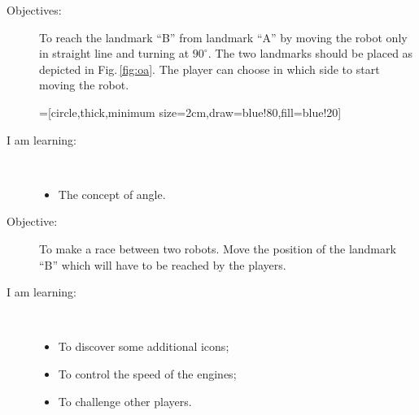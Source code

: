 \begin{flushleft}
\begin{description}
\item[Objectives:] To reach the landmark ``B'' from landmark ``A'' by moving the robot only in straight line and turning at $90^{\circ}$. The two landmarks should be placed as depicted in Fig.\,\ref{fig:oa}. The player can choose in which side to start moving the robot. 
\begin{minipage}[c]{\textwidth}
\centering
{}=[circle,thick,minimum size=2cm,draw=blue!80,fill=blue!20]
\vspace{1ex}
\label{fig:oa}
\end{minipage}
\item[I am learning:] \hfill \\ \vspace{-1ex}
  \begin{itemize}
  \item The concept of angle.
  \end{itemize}
\end{description}
\end{flushleft}
\frameboxend

\begin{flushleft}
\begin{description}
\item[Objective:] To make a race between two robots. Move the position of the landmark ``B'' which will have to be reached by the players.
\item[I am learning:] \hfill \\ \vspace{-1ex}
  \begin{itemize}
  \item To discover some additional icons;
  \item To control the speed of the engines;
  \item To challenge other players.
  \end{itemize}
\end{description}
\end{flushleft}
\frameboxend
